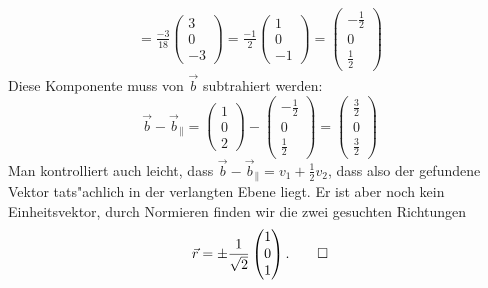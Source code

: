 \begin{loesung}
\begin{teilaufgaben}
\begin{align*}
=
\frac{-3}{18}\begin{pmatrix}3\\0\\-3\end{pmatrix}
=
\frac{-1}{2}\begin{pmatrix}1\\0\\-1\end{pmatrix}
=
\begin{pmatrix}-\frac12\\0\\\frac12\end{pmatrix}
\end{align*}
Diese Komponente muss von $\vec b$ subtrahiert werden:
\[
\vec b -\vec b_{\|}
=\begin{pmatrix}1\\0\\2\end{pmatrix}
-
\begin{pmatrix}-\frac12\\0\\\frac12\end{pmatrix}
=
\begin{pmatrix}\frac32\\0\\\frac32\end{pmatrix}
\]
Man kontrolliert auch leicht, dass
$\vec b -\vec b_{\|} = v_1+\frac12v_2$, dass also der gefundene
Vektor tats"achlich in der verlangten Ebene liegt.
Er ist aber noch kein Einheitsvektor, durch Normieren finden wir
die zwei gesuchten Richtungen
\[
\vec r=\pm\frac1{\sqrt{2}}\begin{pmatrix}1\\0\\1\end{pmatrix}.
\qedhere
\]
\end{teilaufgaben}
\end{loesung}


